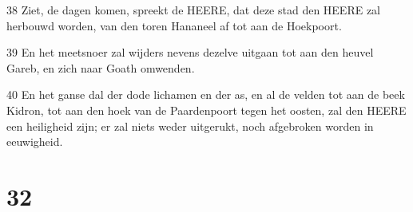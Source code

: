 \par 38 Ziet, de dagen komen, spreekt de HEERE, dat deze stad den HEERE zal herbouwd worden, van den toren Hananeel af tot aan de Hoekpoort.
\par 39 En het meetsnoer zal wijders nevens dezelve uitgaan tot aan den heuvel Gareb, en zich naar Goath omwenden.
\par 40 En het ganse dal der dode lichamen en der as, en al de velden tot aan de beek Kidron, tot aan den hoek van de Paardenpoort tegen het oosten, zal den HEERE een heiligheid zijn; er zal niets weder uitgerukt, noch afgebroken worden in eeuwigheid.

\chapter{32}

